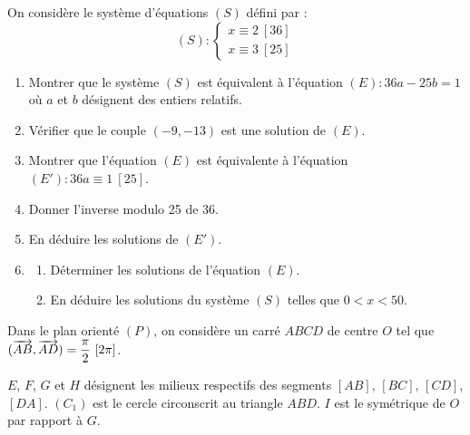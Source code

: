 \documentclass[11pt]{article}
\begin{document}


On considère le système d'équations $(S)$ défini par :
\[ (S) : \begin{cases} x \equiv 2\ [36] \\ x \equiv 3\ [25] \end{cases} \]

\begin{enumerate}
  \item Montrer que le système $(S)$ est équivalent à l'équation $(E) : 36a - 25b = 1$ où $a$ et $b$ désignent des entiers relatifs.
  \item Vérifier que le couple $(-9, -13)$ est une solution de $(E)$.
  \item Montrer que l'équation $(E)$ est équivalente à l'équation $(E') : 36a \equiv 1\ [25]$.
  \item Donner l'inverse modulo 25 de 36.
  \item En déduire les solutions de $(E')$.
  \item \begin{enumerate}[label=\alph*.]
    \item Déterminer les solutions de l'équation $(E)$.
    \item En déduire les solutions du système $(S)$ telles que $0 < x < 50$.
  \end{enumerate}
\end{enumerate}


Dans le plan orienté $(P)$, on considère un carré $ABCD$ de centre $O$ tel que $(\vv{AB},\vv{AD}) = \dfrac{\pi}{2}\ [2\pi]$.

$E$, $F$, $G$ et $H$ désignent les milieux respectifs des segments $[AB]$, $[BC]$, $[CD]$, $[DA]$. $(C_1)$ est le cercle circonscrit au triangle $ABD$. $I$ est le symétrique de $O$ par rapport à $G$.
\end{document}
